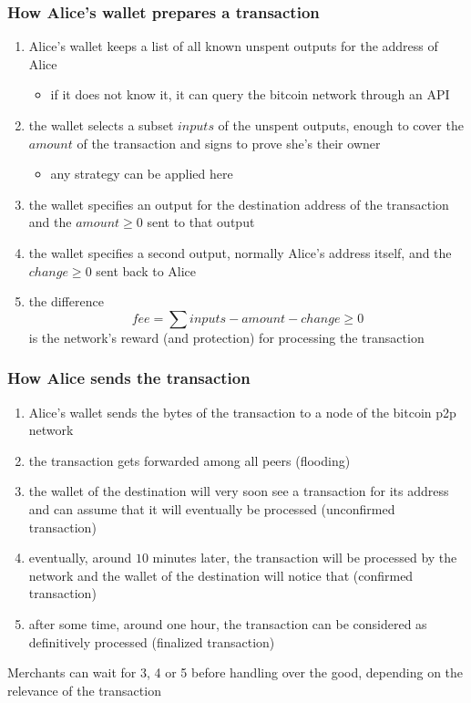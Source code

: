 \documentclass[11pt]{beamer}  %
\begin{document}
\begin{frame}\frametitle{How Alice's wallet prepares a transaction}

  \begin{enumerate}
  \item Alice's wallet keeps a list of all known unspent outputs for the address
    of Alice
    \begin{itemize}
    \item if it does not know it, it can query the bitcoin network through an API
    \end{itemize}
  \item the wallet selects a subset $\mathit{inputs}$ of the unspent outputs, enough to cover
    the $\mathit{amount}$ of the transaction and signs to prove she's their owner
    \begin{itemize}
    \item any strategy can be applied here
    \end{itemize}
  \item the wallet specifies an output for the destination address of the transaction
    and the $\mathit{amount}\ge 0$ sent to that output
  \item the wallet specifies a second output, normally Alice's address itself, and the
    $\mathit{change}\ge 0$ sent back to Alice
  \item the difference
    \[
    \mathit{fee}=\sum\mathit{inputs}-\mathit{amount}-\mathit{change}\ge 0
    \]
    is the network's reward (and protection) for processing the transaction
  \end{enumerate}

\end{frame}

\begin{frame}\frametitle{How Alice sends the transaction}

  \begin{enumerate}
  \item Alice's wallet sends the bytes of the transaction to a node of the
    bitcoin p2p network
  \item the transaction gets forwarded among all peers (flooding)
  \item the wallet of the destination will very soon see a transaction
    for its address and can assume that it will eventually be processed
    (\alert{unconfirmed transaction})
  \item eventually, around $10$ minutes later,
    the transaction will be processed by the network and
    the wallet of the destination will notice that (\alert{confirmed transaction})
  \item after some time, around one hour, the transaction can be considered
    as definitively processed (\alert{finalized transaction})
  \end{enumerate}

  Merchants can wait for 3, 4 or 5 before handling over the good,
  depending on the relevance of the transaction

\end{frame}
\end{document}
